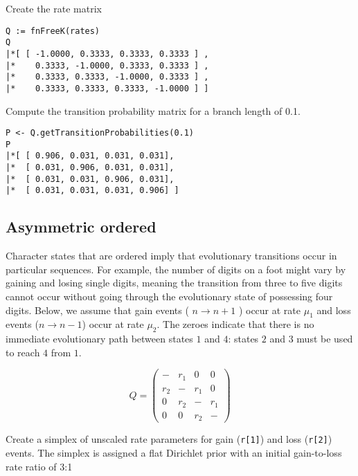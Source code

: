 Create the rate matrix
{\tt \begin{snugshade*}
\begin{lstlisting}
Q := fnFreeK(rates)
Q
|*[ [ -1.0000, 0.3333, 0.3333, 0.3333 ] ,
|*    0.3333, -1.0000, 0.3333, 0.3333 ] ,
|*    0.3333, 0.3333, -1.0000, 0.3333 ] ,
|*    0.3333, 0.3333, 0.3333, -1.0000 ] ]
\end{lstlisting}
\end{snugshade*}}

Compute the transition probability matrix for a branch length of 0.1.

{\tt \begin{snugshade*}
\begin{lstlisting}
P <- Q.getTransitionProbabilities(0.1)
P
|*[ [ 0.906, 0.031, 0.031, 0.031],
|*  [ 0.031, 0.906, 0.031, 0.031],
|*  [ 0.031, 0.031, 0.906, 0.031],
|*  [ 0.031, 0.031, 0.031, 0.906] ]
\end{lstlisting}
\end{snugshade*}}



\subsection{Asymmetric ordered}

Character states that are ordered imply that evolutionary transitions occur in particular sequences.
For example, the number of digits on a foot might vary by gaining and losing single digits, meaning the transition from three to five digits cannot occur without going through the evolutionary state of possessing four digits.
Below, we assume that gain events ( $n \rightarrow n+1$ ) occur at rate $\mu_1$ and loss events ($n \rightarrow n-1$) occur at rate $\mu_2$.
The zeroes indicate that there is no immediate evolutionary path between states $1$ and $4$: states $2$ and $3$ must be used to reach $4$ from $1$.

\begin{equation*}
Q = \begin{pmatrix}
- & r_1 & 0 & 0 \\
r_2 & -   & r_1 & 0 \\
0 & r_2 & -   & r_1 \\
0 & 0 & r_2 & - 
\end{pmatrix}
\end{equation*}


Create a simplex of unscaled rate parameters for gain ({\tt r[1]}) and loss ({\tt r[2]}) events.
The simplex is assigned a flat Dirichlet prior with an initial gain-to-loss rate ratio of 3:1

